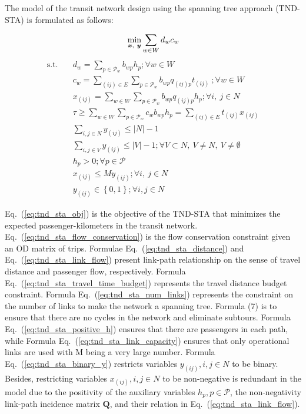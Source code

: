 \documentclass[10pt,english]{article}
\renewcommand{\eqref}[1]{Eq.~(\ref{#1})}
\begin{document}
\begin{table}[H]
\end{table}

The model of the transit network design using the spanning tree approach (TND-STA) is formulated as follows:

\begin{equation}{\label{eq:tnd_sta_obj}}
  \min_{\boldsymbol{x},\ \boldsymbol{y}}\sum_{w\in W}{d_wc_w} \\
\end{equation}
\begin{align}
\text{s.t.}\quad & d_w=\sum_{p\in\mathcal{P}_w}{b_{wp}h_p};\forall w\in W \label{eq:tnd_sta_flow_conservation}\\
& c_w=\sum_{\left(ij\right)\in E}\sum_{p\in\mathcal{P}_w}{b_{wp}q_{\left(ij\right)p}t_{\left(ij\right)}\ };\forall w\in W \label{eq:tnd_sta_distance}\\ 
& x_{\left(ij\right)}=\sum_{w\in W}\sum_{p\in\mathcal{P}_w}{b_{wp}q_{\left(ij\right)p}h_p};\forall i,\ j\in N \label{eq:tnd_sta_link_flow}\\
& \tau\geq\sum_{w\in W}\sum_{p\in\mathcal{P}_w}{c_wb_{wp}h_p}=\sum_{\left(ij\right)\in E}{t_{\left(ij\right)}x_{\left(ij\right)}} \label{eq:tnd_sta_travel_time_budget}\\
& \sum_{i,j\in N} y_{\left(ij\right)}\leq |N|-1 \label{eq:tnd_sta_num_links}\\
& \sum_{i,j\in V} y_{\left(ij\right)}\leq \left|V\right|-1;\forall V\subset N,\ V\neq N,\ V\neq\emptyset \label{eq:tnd_sta_no_cycles} \\
& h_p>0;\forall p\in\mathcal{P} \label{eq:tnd_sta_positive_h}\\
& x_{\left(ij\right)}\le My_{\left(ij\right)};\forall i,\ j\in N \label{eq:tnd_sta_link_capacity}\\
& y_{\left(ij\right)}\in\left\{0,1\right\};\forall i,j\in N \label{eq:tnd_sta_binary_y} 
\end{align}

\eqref{eq:tnd_sta_obj} is the objective of the TND-STA that minimizes the expected passenger-kilometers in the transit network. \eqref{eq:tnd_sta_flow_conservation} is the flow conservation constraint given an OD matrix of trips. Formulae \eqref{eq:tnd_sta_distance} and \eqref{eq:tnd_sta_link_flow} present link-path relationship on the sense of travel distance and passenger flow, respectively. Formula \eqref{eq:tnd_sta_travel_time_budget} represents the travel distance budget constraint. Formula \eqref{eq:tnd_sta_num_links} represents the constraint on the number of links to make the network a spanning tree. Formula (7) is to ensure that there are no cycles in the network and eliminate subtours. Formula \eqref{eq:tnd_sta_positive_h} ensures that there are passengers in each path, while Formula \eqref{eq:tnd_sta_link_capacity} ensures that only operational links are used with M being a very large number. Formula \eqref{eq:tnd_sta_binary_y} restricts variables $y_{\left(ij\right)},i,j\in N$ to be binary. Besides, restricting variables $x_{\left(ij\right)},i,j\in N$ to be non-negative is redundant in the model due to the positivity of the auxiliary variables $h_p,p\in\mathcal{P}$, the non-negativity link-path incidence matrix $\boldsymbol{Q}$, and their relation in \eqref{eq:tnd_sta_link_flow}.
\end{document}
